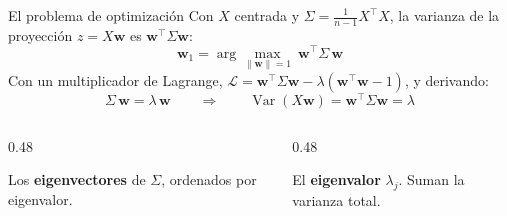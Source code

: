 \documentclass[aspectratio=169,12pt]{beamer}
\begin{document}
\begin{frame}{El problema de optimización}
  \small Con $X$ centrada y $\Sigma = \frac{1}{n-1}X^\top X$, la varianza de la proyección $z = X\mathbf{w}$ es $\mathbf{w}^\top \Sigma \mathbf{w}$:
  \[ \mathbf{w}_1 = \arg\max_{\lVert \mathbf{w} \rVert = 1} \ \mathbf{w}^\top \Sigma\, \mathbf{w} \]
  Con un multiplicador de Lagrange, $\mathcal{L} = \mathbf{w}^\top\Sigma\mathbf{w} - \lambda(\mathbf{w}^\top\mathbf{w}-1)$, y derivando:
  \[ \Sigma\, \mathbf{w} = \lambda\, \mathbf{w} \qquad\Rightarrow\qquad \operatorname{Var}(X\mathbf{w}) = \mathbf{w}^\top\Sigma\mathbf{w} = \lambda \]
  \begin{columns}[T]
    \begin{column}{0.48\textwidth}
      \begin{defbox}[Componentes]
        \small Los \textbf{eigenvectores} de $\Sigma$, ordenados por eigenvalor.
      \end{defbox}
    \end{column}
    \begin{column}{0.48\textwidth}
      \begin{defbox}
        \small El \textbf{eigenvalor} $\lambda_j$. Suman la varianza total.
      \end{defbox}
    \end{column}
  \end{columns}
\end{frame}
\end{document}
